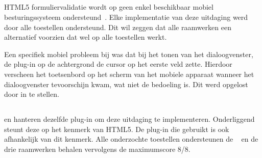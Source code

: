 \subsection{}
\label{sec:evaluatie-ondersteuning-validatie}

HTML5 formuliervalidatie wordt op geen enkel beschikbaar mobiel besturingssysteem ondersteund~\cite{Deveria2013c}.
Elke implementatie van deze uitdaging werd door alle toestellen ondersteund.
Dit wil zeggen dat alle raamwerken een alternatief voorzien dat wel op alle toestellen werkt.

Een specifiek mobiel probleem bij \lungo{} was dat bij het tonen van het dialoogvenster, de plug-in op de achtergrond de cursor op het eerste veld zette. 
Hierdoor verscheen het toetsenbord op het scherm van het mobiele apparaat wanneer het dialoogvenster tevoorschijn kwam, wat niet de bedoeling is. 
Dit werd opgelost door  in te stellen.

% 
% 
% 

\subsection{}
\label{sec:evaluatie-ondersteuning-handtekening}

\kendo{} en \jqm{} hanteren dezelfde plug-in om deze uitdaging te implementeren.
Onderliggend steunt deze op het  kenmerk van HTML5.
De plug-in die \st{} gebruikt is ook afhankelijk van dit kenmerk.
Alle onderzochte toestellen ondersteunen de ~\cite{Deveria2013c} en de drie raamwerken behalen vervolgens de maximumscore 8/8. 

